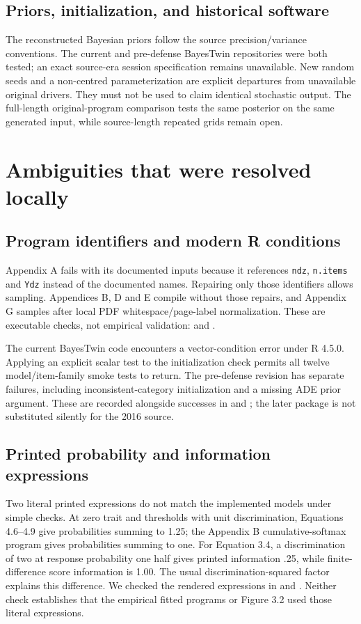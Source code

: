 \subsection{Priors, initialization, and historical software}
The reconstructed Bayesian priors follow the source precision/variance conventions. The current and pre-defense BayesTwin repositories were both tested; an exact source-era session specification remains unavailable. New random seeds and a non-centred parameterization are explicit departures from unavailable original drivers. They must not be used to claim identical stochastic output. The full-length original-program comparison tests the same posterior on the same generated input, while source-length repeated grids remain open.

\section{Ambiguities that were resolved locally}
\subsection{Program identifiers and modern R conditions}
Appendix A fails with its documented inputs because it references \texttt{ndz}, \texttt{n.items} and \texttt{Ydz} instead of the documented names. Repairing only those identifiers allows sampling. Appendices B, D and E compile without those repairs, and Appendix G samples after local PDF whitespace/page-label normalization. These are executable checks, not empirical validation:  and .

The current BayesTwin code encounters a vector-condition error under R 4.5.0. Applying an explicit scalar test to the initialization check permits all twelve model/item-family smoke tests to return. The pre-defense revision has separate failures, including inconsistent-category initialization and a missing ADE prior argument. These are recorded alongside successes in  and ; the later package \citep{bayestwin} is not substituted silently for the 2016 source.

\subsection{Printed probability and information expressions}
Two literal printed expressions do not match the implemented models under simple checks. At zero trait and thresholds with unit discrimination, Equations 4.6--4.9 give probabilities summing to 1.25; the Appendix B cumulative-softmax program gives probabilities summing to one. For Equation 3.4, a discrimination of two at response probability one half gives printed information .25, while finite-difference score information is 1.00. The usual discrimination-squared factor explains this difference. We checked the rendered expressions in  and . Neither check establishes that the empirical fitted programs or Figure 3.2 used those literal expressions.

